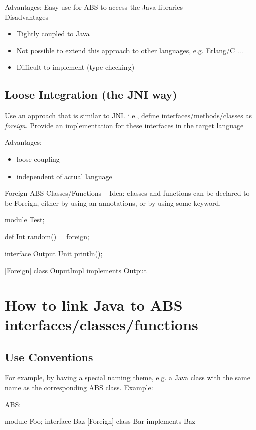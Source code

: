 \documentclass[a4paper,11pt,final]{article}
\begin{document}
\noindent Advantages: Easy use for ABS to access the Java libraries \\

\noindent Disadvantages
\begin{itemize}
  \item Tightly coupled to Java
  \item Not possible to extend this approach to other languages, e.g. Erlang/C
  ...
  \item Difficult to implement (type-checking)
\end{itemize}
  

\subsection{Loose Integration (the JNI way)}
Use an approach that is similar to JNI. i.e., define interfaces/methods/classes
as \emph{foreign}. Provide an implementation for these interfaces in the
target language 

\noindent Advantages: 
\begin{itemize}
  \item loose coupling
  \item independent of actual language 
\end{itemize}


\noindent Foreign ABS Classes/Functions -- Idea: classes and functions can be
declared to be Foreign, either by using an annotations, or by using some keyword.

\begin{absexamplen}
module Test;

def Int random() = foreign;

interface Output {
  Unit println();
}

[Foreign]
class OuputImpl implements Output { }
\end{absexamplen}

\section{How to link Java to ABS interfaces/classes/functions}

\subsection{Use Conventions}
For example, by having a special naming theme, e.g. a Java class with the same
name as the corresponding ABS class. Example:
     
\noindent ABS:
\begin{absexamplen}
module Foo;
interface Baz { }
[Foreign] class Bar implements Baz { }
\end{absexamplen}
\end{document}
